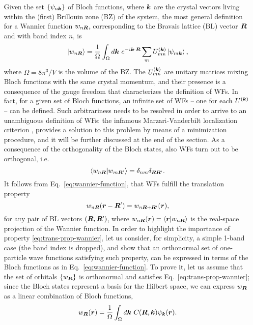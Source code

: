 Given the set $\{ \psi_{n{\bm k}} \}$ of Bloch functions, where ${\bm k}$ are the crystal vectors living within the (first) Brillouin zone (BZ) of the system, the most general definition for a Wannier function $w_{n{\bm R}}$, corresponding to the Bravais lattice (BL) vector ${\bm R}$ and with band index $n$, is
%
\begin{equation}
    \ket{w_{n{\bm R}}} = \frac{1}{\Omega} \int_{\Omega} d{\bm k} \ e^{-i{\bm k} \cdot {\bm R}} \sum_m U^{({\bm k})}_{mn} \ket{\psi_{m{\bm k}}} ,
    \label{eq:wannier-function}
\end{equation}
%
where $\Omega = 8\pi^3 / V$ is the volume of the BZ. The $U^{({\bm k})}_{mn}$ are unitary matrices mixing Bloch functions with the same crystal momentum, and their presence is a consequence of the gauge freedom that characterizes the definition of WFs. In fact, for a given set of Bloch functions, an infinite set of WFs -- one for each $U^{({\bm k})}$ -- can be defined. Such arbitrariness needs to be resolved in order to arrive to an unambiguous definition of WFs: the infamous Marzari-Vanderbilt localization criterion \cite{marzari_maximally_1997}, provides a solution to this problem by means of a minimization procedure, and it will be further discussed at the end of the section. As a consequence of the orthogonality of the Bloch states, also WFs turn out to be orthogonal, i.e.
%
\begin{equation}
    \braket{w_{n{\bm R}} | w_{m{\bm R}'}} = \delta_{nm} \delta_{{\bm R} {\bm R}'} .
    \label{eq:orthogonality-wannier}
\end{equation}
%
It follows from Eq.~\eqref{eq:wannier-function}, that WFs fulfill the translation property
%
\begin{equation}
    w_{n{\bm R}}({\bm r} - {\bm R}') = w_{n{\bm R} + {\bm R}'}({\bm r}) ,
    \label{eq:trans-prop-wannier}
\end{equation}
%
for any pair of BL vectors $({\bm R},{\bm R}')$, where $w_{n{\bm R}}({\bm r}) = \braket{{\bm r}|w_{n{\bm R}}}$ is the real-space projection of the Wannier function. In order to highlight the importance of property \eqref{eq:trans-prop-wannier}, let us consider, for simplicity, a simple 1-band case (the band index is dropped), and show that an orthonormal set of one-particle wave functions satisfying such property, can be expressed in terms of the Bloch functions as in Eq.~\eqref{eq:wannier-function}. To prove it, let us assume that the set of orbitals $\{ w_{{\bm R}} \}$ is orthonormal and satisfies Eq.~\eqref{eq:trans-prop-wannier}; since the Bloch states represent a basis for the Hilbert space, we can express $w_{{\bm R}}$ as a linear combination of Bloch functions,
%
\begin{equation}
    w_{{\bm R}}({\bm r}) = \frac{1}{\Omega} \int_{\Omega} d{\bm k} \ C({\bm R},{\bm k}) \psi_{{\bm k}}({\bm r}) .
    \label{eq:wannier-bloch-linear-combination}
\end{equation}
